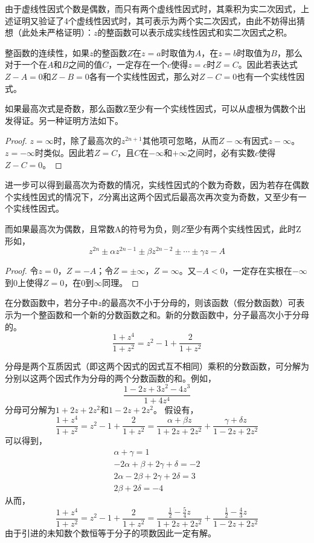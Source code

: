 \begin{note}
由于虚线性因式个数是偶数，而只有两个虚线性因式时，其乘积为实二次因式，上述证明又验证了4个虚线性因式时，其可表示为两个实二次因式，由此不妨得出猜想（此处未严格证明）：$z$的整函数可以表示成实线性因式和实二次因式之积。

整函数的连续性，如果$z$的整函数$Z$在$z=a$时取值为$A$，在$z=b$时取值为$B$，那么对于一个在$A$和$B$之间的值$C$，一定存在一个$c$使得$z=c$时$Z=C$。因此若表达式$Z - A = 0$和$Z - B = 0$各有一个实线性因式，那么对$Z - C = 0$也有一个实线性因式。

如果最高次式是奇数，那么函数Z至少有一个实线性因式，可以从虚根为偶数个出发得证。另一种证明方法如下。
\begin{proof}
    $z = \infty$时，除了最高次的$z^{2n+1}$其他项可忽略，从而$Z - \infty$有因式$z - \infty$。$z = -\infty$时类似。因此若$Z=C$，且$C$在$-\infty$和$+\infty$之间时，必有实数$c$使得$Z - C = 0$。
\end{proof}
进一步可以得到最高次为奇数的情况，实线性因式的个数为奇数，因为若存在偶数个实线性因式的情况下，$Z$分离出这两个因式后最高次再次变为奇数，又至少有一个实线性因式。

而如果最高次为偶数，且常数A的符号为负，则$Z$至少有两个实线性因式，此时Z形如，
$$z^{2n} \pm \alpha z^{2n-1} \pm \beta z^{2n-2} \pm \cdots \pm \gamma z - A$$
\begin{proof}
    令$z=0$，$Z=-A$；令$Z=\pm \infty$，$Z = \infty$。又$-A < 0$，一定存在实根在$-\infty$到$0$上使得$Z=0$，在$0$到$\infty$同理。
\end{proof}

在分数函数中，若分子中$z$的最高次不小于分母的，则该函数（假分数函数）可表示为一个整函数和一个新的分数函数之和。新的分数函数中，分子最高次小于分母的。
$$\frac{1+z^4}{1+z^2} = z^2 - 1 + \frac{2}{1+z^2}$$

分母是两个互质因式（即这两个因式的因式互不相同）乘积的分数函数，可分解为分别以这两个因式作为分母的两个分数函数的和。例如，
$$\frac{1 - 2z + 3z^2 - 4z^3}{1 + 4z^4}$$
分母可分解为$1 + 2z + 2z^2$和$1 - 2z + 2z^2$。
假设有，
$$\frac{1+z^4}{1+z^2} = z^2 - 1 + \frac{2}{1+z^2} = \frac{\alpha + \beta z}{1 + 2z + 2z^2} + \frac{\gamma + \delta z}{1 - 2z + 2z^2}$$
可以得到，
\begin{gather*}
    \alpha + \gamma = 1\\
    -2\alpha + \beta + 2\gamma + \delta = -2\\
    2\alpha - 2\beta + 2\gamma + 2\delta = 3\\
    2\beta + 2\delta = -4
\end{gather*}
从而，
$$\frac{1+z^4}{1+z^2} = z^2 - 1 + \frac{2}{1+z^2} = \frac{\frac{1}{2} - \frac{5}{4} z}{1 + 2z + 2z^2} + \frac{\frac{1}{2} - \frac{4}{3} z}{1 - 2z + 2z^2}$$
由于引进的未知数个数恒等于分子的项数因此一定有解。


\end{note}
